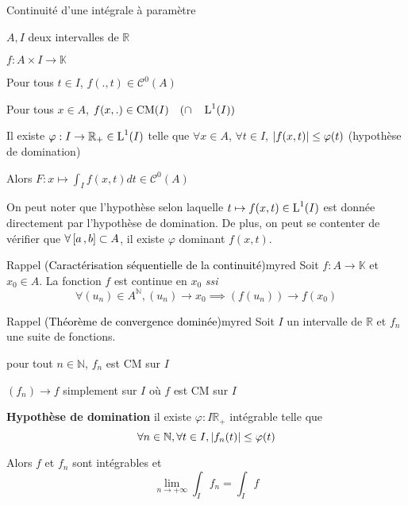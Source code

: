     \begin{theo}{Continuité d’une intégrale à paramètre}{}
        \begin{soit}
            \item $A,I$ deux intervalles de $\mathbb{R}$
            \item $f : A \times I \to \mathbb{K}$
        \end{soit}
        \begin{suppose}
            \item Pour tous $t \in I$, $f(.,t) \in \mathcal{C}^0(A)$
            \item Pour tous $x \in A$, $f(x,.) \in \operatorname{CM}(I) \quad (\cap \quad \operatorname{L}^1(I))$
            \item Il existe $\varphi : I \to \mathbb{R}_+ \in \operatorname{L}^1(I)$ telle que $\forall x \in A$, $\forall t \in I$, $\left\lvert f(x,t)\right\rvert \leq \varphi(t)$ (hypothèse de domination)
        \end{suppose}
        Alors $F : x \mapsto \int_{I} f(x,t) dt \in \mathcal{C}^0(A)$
    \end{theo}

    On peut noter que l’hypothèse selon laquelle $t \mapsto f(x,t) \in \operatorname{L}^1(I)$ est donnée directement par l’hypothèse de domination. De plus, on peut se contenter de vérifier que $\forall \left[ a \, , b \right] \subset A$, il existe $\varphi$ dominant $f(x,t)$.

    \begin{omed}{Rappel \textcolor{black}{(Caractérisation séquentielle de la continuité)}}{myred}
        Soit $f : A \to \mathbb{K}$ et $x_0 \in A$. La fonction $f$ est continue en $x_0$ \textit{ssi} 
        \[ \forall (u_n) \in A^{\mathbb{N}}, (u_n) \to x_0 \implies (f(u_n)) \to f(x_0) \]   
    \end{omed}

    \begin{omed}{Rappel \textcolor{black}{(Théorème de convergence dominée)}}{myred}
        Soit $I$ un intervalle de $\mathbb{R}$ et $f_n$ une suite de fonctions. 
        \begin{suppose}
            \item pour tout $n \in \mathbb{N}$, $f_n$ est CM sur $I$
            \item $(f_n) \to f$ simplement sur $I$ où $f$ est CM sur $I$
            \item \textbf{Hypothèse de domination} \quad il existe $\varphi : I \mathbb{R}_+$ intégrable telle que 
            \[ \forall n \in \mathbb{N}, \forall t \in I, \left\lvert f_n(t)\right\rvert \leq \varphi(t) \]   
        \end{suppose}
        Alors $f$ et $f_n$ sont intégrables et 
        \[ \lim_{n \to +\infty} \int_I f_n = \int_I f \]
    \end{omed}

